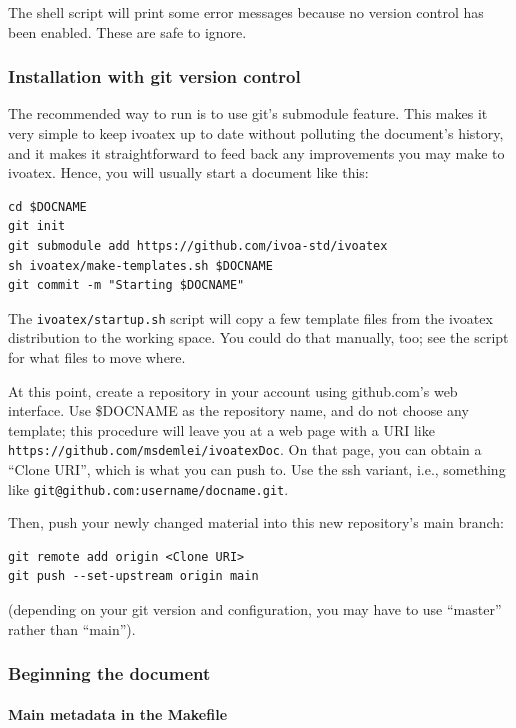 \documentclass[11pt,a4paper]{ivoa}
\begin{document}
The shell script will print some error messages because no version
control has been enabled.  These are safe to ignore.

\subsubsection{Installation with git version control}

The recommended way to run \ivoatex{}
is to use git's submodule feature.  This makes it very simple to keep
ivoatex up to date without polluting the
document's history, and it makes it straightforward to
feed back any improvements you may make to ivoatex.  Hence, you will
usually start a document like this:

\begin{lstlisting}[basicstyle=\footnotesize]
cd $DOCNAME
git init
git submodule add https://github.com/ivoa-std/ivoatex
sh ivoatex/make-templates.sh $DOCNAME
git commit -m "Starting $DOCNAME"
\end{lstlisting}

The \verb|ivoatex/startup.sh| script will copy a few template files from
the ivoatex distribution to the working space.  You could do that
manually, too; see the script for what files to move where.

At this point, create a repository in your account using github.com's web
interface. Use \$DOCNAME as the repository name, and do not choose any
template; this procedure will leave you at a web page with a URI like
\nolinkurl{https://github.com/msdemlei/ivoatexDoc}.
On that page, you can obtain a
``Clone URI'', which is what you can push to.  Use the ssh variant,
i.e., something like \verb|git@github.com:username/docname.git|.

Then, push your newly changed material into this new repository's main
branch:
\begin{lstlisting}[basicstyle=\footnotesize]
git remote add origin <Clone URI>
git push --set-upstream origin main
\end{lstlisting}
(depending on your git version and configuration,
you may have to use ``master'' rather
than ``main'').

\subsubsection{Beginning the document}
\label{sect:beginning}

\paragraph{Main metadata in the Makefile}
\label{sect:mainmeta}
\end{document}
